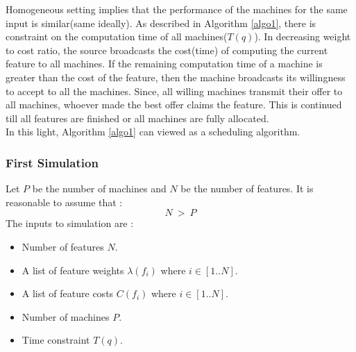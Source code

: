 \documentclass[10pt, conference, compsocconf]{IEEEtran}
\begin{document}
Homogeneous setting implies that the performance of the machines for the same input is similar(same ideally). As described in Algorithm \ref{algo1}, there is constraint on the computation time of all machines($T(q)$). In decreasing weight to cost ratio, the source broadcasts the cost(time) of computing the current feature to all machines. If the remaining computation time of a machine is greater than the cost of the feature, then the machine broadcasts its willingness to accept to all the machines. Since, all willing machines transmit their offer to all machines, whoever made the best offer claims the feature. This is continued till all features are finished or all machines are fully allocated. \\
In this light, Algorithm \ref{algo1} can viewed as a scheduling algorithm. \\
\subsubsection{First Simulation}
Let $P$ be the number of machines and $N$ be the number of features. It is reasonable to assume that :
$$ N\ >\ P$$
The inputs to simulation are :
\begin {itemize}
\item Number of features $N$.
\item A list of feature weights $\lambda(f_i)$ where $i \in [1..N]$. 
\item A list of feature costs $C(f_i)$ where $i \in [1..N]$.
\item Number of machines $P$.
\item Time constraint $T(q)$.
\end{itemize}
\end{document}
